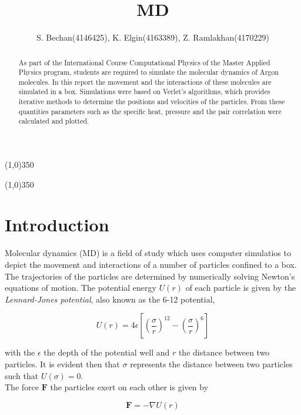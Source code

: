 \documentclass[10pt,a4paper,notitlepage]{article}
\author{S. Bechan(4146425), K. Elgin(4163389), Z. Ramlakhan(4170229)}
\title{MD}
\begin{document}
    \maketitle
    \begin{center}
    \line(1,0){350}
    \end{center}
    \begin{abstract}
      As part of the International Course Computational Physics of the Master Applied Physics program, students are required to simulate the molecular dynamics of Argon molecules. In this report the movement and the interactions of these molecules are simulated in a box. Simulations were based on Verlet's algorithms, which provides iterative methods to determine the positions and velocities of the particles. From these quantities parameters such as the specific heat, pressure and the pair correlation were calculated and plotted. 
 
    \end{abstract}
    \begin{center}
    \line(1,0){350}
    \end{center}

\section{Introduction}\label{sec:intro}
Molecular dynamics (MD) is a field of study which uses computer simulatios to depict the movement and interactions of a number of particles confined to a box. The trajectories of the particles are determined by numerically solving Newton's equations of motion. The potential energy $U(r)$ of each particle is given by the \textit{Lennard-Jones potential}, also known as the 6-12 potential,

\begin{equation}\label{LJ}
U (r)= 4\epsilon\left[\left(\frac{\sigma}{r}\right)^{12} - \left(\frac{\sigma}{r}\right)^6\right]
\end{equation}

with the $\epsilon$ the depth of the potential well and $r$ the distance between two particles. It is evident then that $\sigma$ represents the distance between two particles such that $U(\sigma)=0$.\\
The force $\textbf{F}$ the particles exert on each other is given by

\begin{equation}\label{F}
\textbf{F}= -\nabla  U(r)
\end{equation}
\end{document}
